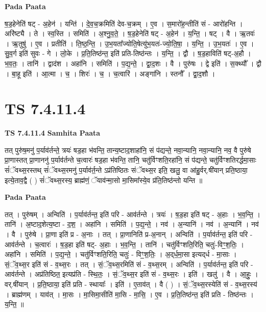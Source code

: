 \documentclass[17pt]{extarticle}
\begin{document}
\textbf{Pada Paata} \newline

ष॒ड॒हेनेति॑ षट् - अ॒हेन॑ । यन्ति॑ । दे॒व॒च॒क्रमिति॑ देव-च॒क्रम् । ए॒व । स॒मारो॑ह॒न्तीति॑ सं - आरो॑हन्ति । अरि॑ष्ट्यै । ते । स्व॒स्ति । समिति॑ । अ॒श्नु॒व॒ते॒ । ष॒ड॒हेनेति॑ षट् - अ॒हेन॑ । य॒न्ति॒ । षट् । वै । ऋ॒तवः॑ । ऋ॒तुषु॑ । ए॒व । प्रतीति॑ । ति॒ष्ठ॒न्ति॒ । उ॒भ॒यता᳚ज्योति॒षेत्यु॑भ॒यतः॑-ज्यो॒ति॒षा॒ । य॒न्ति॒ । उ॒भ॒यतः॑ । ए॒व । सु॒व॒र्ग इति॑ सुवः - गे । लो॒के । प्र॒ति॒तिष्ठ॑न्त॒ इति॑ प्रति-तिष्ठ॑न्तः । य॒न्ति॒ । द्वौ । ष॒ड॒हाविति॑ षट्-अ॒हौ । भ॒व॒तः॒ । तानि॑ । द्वाद॑श । अहा॑नि । समिति॑ । प॒द्य॒न्ते॒ । द्वा॒द॒शः । वै । पुरु॑षः । द्वे इति॑ । स॒क्थ्यौ᳚ । द्वौ । बा॒हू इति॑ । आ॒त्मा । च॒ । शिरः॑ । च॒ । च॒त्वारि॑ । अङ्गा॑नि । स्तनौ᳚ । द्वा॒द॒शौ ।  \newline




\section*{ TS 7.4.11.4 }

\textbf{TS 7.4.11.4 } \newline
\textbf{Samhita Paata} \newline

तत् पुरु॑ष॒मनु॑ प॒र्याव॑र्तन्ते॒ त्रयः॑ षड॒हा भ॑वन्ति॒ तान्य॒ष्टाद॒शाहा॑नि॒ सं प॑द्यन्ते॒ नवा॒न्यानि॒ नवा॒न्यानि॒ नव॒ वै पुरु॑षे प्रा॒णास्तत् प्रा॒णाननु॑ प॒र्याव॑र्तन्ते च॒त्वारः॑ षड॒हा भ॑वन्ति॒ तानि॒ चतु॑र्विꣳशति॒रहा॑नि॒ सं प॑द्यन्ते॒ चतु॑र्विꣳशतिरर्द्धमा॒साः सं॑ॅवथ्स॒रस्तथ् सं॑ॅवथ्स॒रमनु॑ प॒र्याव॑र्त॒न्ते ऽप्र॑तिष्ठितः संॅवथ्स॒र इति॒ खलु॒ वा आ॑हु॒र्वर्.षी॑यान् प्रति॒ष्ठाया॒ इत्ये॒ताव॒द्वै ( ) सं॑ॅवथ्स॒रस्य॒ ब्राह्म॑णं॒ ॅयाव॑न्मा॒सो मा॒सिमा᳚स्ये॒व प्र॑ति॒तिष्ठ॑न्तो यन्ति ॥ \newline

\textbf{Pada Paata} \newline

तत् । पुरु॑षम् । अन्विति॑ । प॒र्याव॑र्तन्त॒ इति॑ परि - आव॑र्तन्ते । त्रयः॑ । ष॒ड॒हा इति॑ षट् - अ॒हाः । भ॒व॒न्ति॒ । तानि॑ । अ॒ष्टाद॒शेत्य॒ष्टा - द॒श॒ । अहा॑नि । समिति॑ । प॒द्य॒न्ते॒ । नव॑ । अ॒न्यानि॑ । नव॑ । अ॒न्यानि॑ । नव॑ । वै । पुरु॑षे । प्रा॒णा इति॑ प्र - अ॒नाः । तत् । प्रा॒णानिति॑ प्र-अ॒नान् । अन्विति॑ । प॒र्याव॑र्तन्त॒ इति॑ परि - आव॑र्तन्ते । च॒त्वारः॑ । ष॒ड॒हा इति॑ षट्- अ॒हाः । भ॒व॒न्ति॒ । तानि॑ । चतु॑र्विꣳशति॒रिति॒ चतुः॑-विꣳ॒॒श॒तिः॒ । अहा॑नि । समिति॑ । प॒द्य॒न्ते॒ । चतु॑र्विꣳशति॒रिति॒ चतुः॑ - विꣳ॒॒श॒तिः॒ । अ॒द्‌र्ध॒मा॒सा इत्यद्‌र्ध - मा॒साः । सं॒ॅव॒थ्स॒र इति॑ सं - व॒थ्स॒रः । तत् । सं॒ॅव॒थ्स॒रमिति॑ सं - व॒थ्स॒रम् । अन्विति॑ । प॒र्याव॑र्तन्त॒ इति॑ परि - आव॑र्तन्ते । अप्र॑तिष्ठित॒ इत्यप्र॑ति - स्थि॒तः॒ । सं॒ॅव॒थ्स॒र इति॑ सं - व॒थ्स॒रः । इति॑ । खलु॑ । वै । आ॒हुः॒ । वर्.षी॑यान् । प्र॒ति॒ष्ठाया॒ इति॑ प्रति - स्थायाः᳚ । इति॑ । ए॒ताव॑त् । वै ( ) । सं॒ॅव॒थ्स॒रस्येति॑ सं - व॒थ्स॒रस्य॑ । ब्राह्म॑णम् । याव॑त् । मा॒सः । मा॒सिमा॒सीति॑ मा॒सि - मा॒सि॒ । ए॒व । प्र॒ति॒तिष्ठ॑न्त॒ इति॑ प्रति - तिष्ठ॑न्तः । य॒न्ति॒ ॥  \newline
\end{document}
